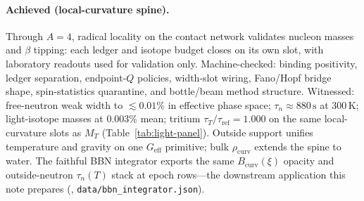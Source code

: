\documentclass[11pt,notitlepage]{amsart}
\begin{document}
\paragraph{Achieved (local-curvature spine).}
Through $A=4$, radical locality on the contact network validates nucleon masses and
$\beta$ tipping: each ledger and isotope budget closes on its own slot, with laboratory
readouts used for validation only. Machine-checked: binding positivity, ledger
separation, endpoint-$Q$ policies, width-slot wiring, Fano/Hopf bridge shape,
spin-statistics quarantine, and bottle/beam method structure. Witnessed: free-neutron
weak width to $\lesssim 0.01\%$ in effective phase space; $\tau_n\approx 880\,\mathrm{s}$
at $300\,\mathrm{K}$; light-isotope masses at $0.003\%$ mean; tritium
$\tau_T/\tau_{\mathrm{ref}}=1.000$ on the same local-curvature slots as $M_T$
(Table~\ref{tab:light-panel}). Outside support unifies temperature and gravity on one
$G_{\mathrm{eff}}$ primitive; bulk $\rho_{\mathrm{curv}}$ extends the spine to water.
The faithful BBN integrator exports the same $B_{\mathrm{curv}}(\xi)$ opacity and
outside-neutron $\tau_n(T)$ stack at epoch rows---the downstream application this note
prepares (\cite{hqiv-bbn-paper}, \texttt{data/bbn\_integrator.json}).
\end{document}
